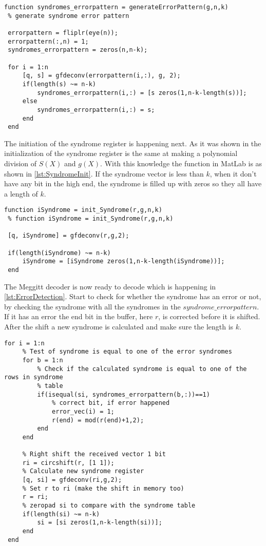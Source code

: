 \documentclass[Main]{subfiles}
\begin{document}
\begin{lstlisting}[caption=Error pattern creation, style=Code-Matlab, label=lst:ErrorPatternCreate]
 function syndromes_errorpattern = generateErrorPattern(g,n,k)
 % generate syndrome error pattern
 
 errorpattern = fliplr(eye(n));
 errorpattern(:,n) = 1;
 syndromes_errorpattern = zeros(n,n-k);
 
 for i = 1:n
     [q, s] = gfdeconv(errorpattern(i,:), g, 2);
     if(length(s) ~= n-k)
         syndromes_errorpattern(i,:) = [s zeros(1,n-k-length(s))];
     else
         syndromes_errorpattern(i,:) = s;
     end
 end
\end{lstlisting}

The initiation of the syndrome register is happening next.
As it was shown in  the initialization of the syndrome register is the same at making a polynomial division of $S(X)$ and $g(X)$.
With this knowledge the function in MatLab is as shown in \codeTitle \ref{lst:SyndromeInit}.
If the syndrome vector is less than $k$, when it don't have any bit in the high end, the syndrome is filled up with zeros so they all have a length of $k$.

\begin{lstlisting}[caption=Syndrome initialization, style=Code-Matlab, label=lst:SyndromeInit]
 function iSyndrome = init_Syndrome(r,g,n,k)
 % function iSyndrome = init_Syndrome(r,g,n,k)
 
 [q, iSyndrome] = gfdeconv(r,g,2);
 
 if(length(iSyndrome) ~= n-k)
     iSyndrome = [iSyndrome zeros(1,n-k-length(iSyndrome))];
 end
\end{lstlisting}

The Meggitt decoder is now ready to decode which is happening in \codeTitle \ref{lst:ErrorDetection}.
Start to check for whether the syndrome has an error or not, by checking the syndrome with all the syndromes in the $syndrome\_errorpattern$.
If it has an error the end bit in the buffer, here $r$, is corrected before it is shifted.
After the shift a new syndrome is calculated and make sure the length is $k$.

\begin{lstlisting}[caption=Error detection, style=Code-Matlab, label=lst:ErrorDetection]
 for i = 1:n
     % Test of syndrome is equal to one of the error syndromes
     for b = 1:n
         % Check if the calculated syndrome is equal to one of the rows in syndrome
         % table
         if(isequal(si, syndromes_errorpattern(b,:))==1)
             % correct bit, if error happened
             error_vec(i) = 1;
             r(end) = mod(r(end)+1,2);
         end
     end
     
     % Right shift the received vector 1 bit
     ri = circshift(r, [1 1]);
     % Calculate new syndrome register
     [q, si] = gfdeconv(ri,g,2);
     % Set r to ri (make the shift in memory too)
     r = ri;
     % zeropad si to compare with the syndrome table
     if(length(si) ~= n-k)
         si = [si zeros(1,n-k-length(si))];
     end
 end
\end{lstlisting}
\end{document}
